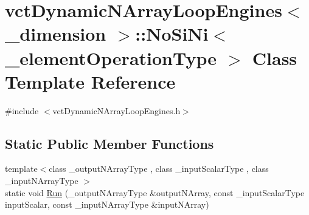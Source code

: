 \hypertarget{classvct_dynamic_n_array_loop_engines_1_1_no_si_ni}{\section{vct\-Dynamic\-N\-Array\-Loop\-Engines$<$ \-\_\-dimension $>$\-:\-:No\-Si\-Ni$<$ \-\_\-element\-Operation\-Type $>$ Class Template Reference}
\label{classvct_dynamic_n_array_loop_engines_1_1_no_si_ni}
}


{\ttfamily \#include $<$vct\-Dynamic\-N\-Array\-Loop\-Engines.\-h$>$}

\subsection*{Static Public Member Functions}
\begin{DoxyCompactItemize}
\item 
{\footnotesize template$<$class \-\_\-output\-N\-Array\-Type , class \-\_\-input\-Scalar\-Type , class \-\_\-input\-N\-Array\-Type $>$ }\\static void \hyperlink{classvct_dynamic_n_array_loop_engines_1_1_no_si_ni_a02bfc764133bcb4f7da60823215929e7}{Run} (\-\_\-output\-N\-Array\-Type \&output\-N\-Array, const \-\_\-input\-Scalar\-Type input\-Scalar, const \-\_\-input\-N\-Array\-Type \&input\-N\-Array)
\end{DoxyCompactItemize}


